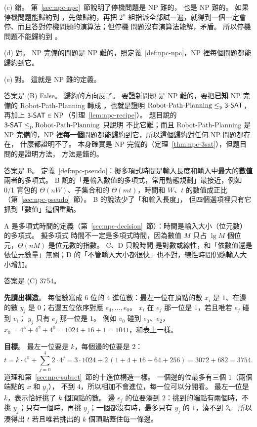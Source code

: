 (c) 錯。 第~\ref{sec:npc-npc}~節說明了停機問題是 NP 難的， 也是 NP 難的。 如果停機問題能歸約到
，先做歸約，再把 $2^n$ 組指派全部試一遍，就得到一個一定會停、而且答對停機問題的演算法；但停機
問題沒有演算法能解，矛盾。 所以停機問題不能歸約到 。

(d) 對。 NP 完備的問題是 NP 難的，照定義~\ref{def:npc-npc}，NP 裡每個問題都能歸約到它。

(e) 對。 這就是 NP 難的定義。

答案是 (B) False。 歸約的方向反了。 要證新問題  是 NP 難的，要把\textbf{已知} NP 完備的
Robot-Path-Planning 轉成 ，也就是證明 $\text{Robot-Path-Planning} \le_{\mathrm{p}}
\textsf{3-SAT}$，再加上 $\textsf{3-SAT} \in \mathrm{NP}$（引理~\ref{lem:npc-recipe}）。 題目說的
$\textsf{3-SAT} \le_{\mathrm{p}} \text{Robot-Path-Planning}$ 只說明  不比它難；而且
Robot-Path-Planning 是 NP 完備的，NP 裡\textbf{每一個}問題都能歸約到它，所以這個歸約對任何 NP 問題都存在，
什麼都證明不了。  本身確實是 NP 完備的（定理~\ref{thm:npc-3sat}），但題目問的是證明方法，
方法是錯的。

答案是 B。 定義~\ref{def:npc-pseudo}：擬多項式時間是輸入長度和輸入中最大的\textbf{數值}兩者的多項式。
B 說的「是輸入數值的多項式，常用動態規劃」最接近，例如 0/1 背包的 $\Theta(nW)$、子集合和的
$\Theta(mt)$，時間和 $W$、$t$ 的數值成正比（第~\ref{sec:npc-pseudo}~節）。 B 的說法少了「和輸入長度」，
但四個選項裡只有它抓到「數值」這個重點。

A 是多項式時間的定義（第~\ref{sec:npc-decision}~節）：時間是輸入大小（位元數）的多項式。 擬多項式
時間不一定是多項式時間，因為數值 $M$ 只占 $\lg M$ 個位元，$\Theta(nM)$ 是位元數的指數。 C、D 只說時間
是對數或線性，和「依數值還是依位元數量」無關；D 的「不管輸入大小都很快」也不對，線性時間仍隨輸入大小增加。

答案是 (C) 3754。

\textbf{先讀出構造}。 每個數寫成 $6$ 位的 $4$ 進位數：最左一位在頂點的數 $x_i$ 是 $1$、在邊的數 $y_j$
是 $0$；右邊五位依序對應 $e_4, \ldots, e_0$。 $x_i$ 在 $e_j$ 那一位是 $1$，若且唯若 $e_j$ 碰到 $v_i$；
$y_j$ 只有 $e_j$ 那一位是 $1$。 例如 $v_0$ 碰到 $e_0$、$e_2$，$x_0 = 4^5 + 4^2 + 4^0 = 1024 + 16 + 1 =
1041$，和表上一樣。

\textbf{目標}。 最左一位要是 $k$，每個邊的位要是 $2$：
\[
t = k \cdot 4^5 + \sum_{j=0}^{4} 2 \cdot 4^j = 3 \cdot 1024 + 2\,(1 + 4 + 16 + 64 + 256) = 3072 + 682 = 3754.
\]
道理和第~\ref{sec:npc-subset}~節的十進位構造一樣。 一個邊的位最多有三個 $1$（兩個端點的 $x$ 和 $y_j$），
不到 $4$，所以相加不會進位，每一位可以分開看。 最左一位是 $k$，表示恰好挑了 $k$ 個頂點的數。 邊 $e_j$
的位要湊到 $2$：挑到的端點有兩個時，不挑 $y_j$；只有一個時，再挑 $y_j$；一個都沒有時，最多只有 $y_j$
的 $1$，湊不到 $2$。 所以湊得出 $t$ 若且唯若挑出的 $k$ 個頂點蓋住每一條邊。

